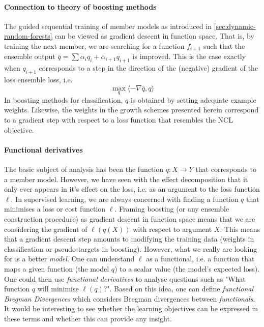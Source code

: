 \documentclass[
	twoside=false, %
]{kaobook}
\begin{document}
\paragraph{Connection to theory of boosting methods} The guided sequential training of member models as introduced in \cref{sec:dynamic-random-forests} can be viewed as gradient descent in function space. That is, by training the next member, we are searching for a function $f_{i+1}$ such that the ensemble output $\bar{q} = \sum \alpha_i q_i + \alpha_{i+1} q_{i+1}$ is improved.
This is the case exactly when $q_{i+1}$ corresponds to a step in the direction of the (negative) gradient of the loss ensemble loss, i.e.
$$
\max_q  \langle - \nabla \bar{q}, q \rangle
$$
In boosting methods for classification, $q$ is obtained by setting adequate example weights. Likewise, the weights in the growth schemes presented herein correspond to a gradient step with respect to a loss function that resembles the NCL objective.


\paragraph{Functional derivatives} The basic subject of analysis has been the function $q: X \to Y$ that corresponds to a member model. However, we have seen with the effect decomposition that it only ever appears in it's effect on the loss, i.e. as an argument to the loss function $\ell$. In supervised learning, we are always concerned with finding a function $q$ that minimises a loss or cost function $\ell$. 
Framing boosting (or any ensemble construction procedure) as gradient descent in function space means that we are considering the gradient of $\ell(q(X))$ with respect to argument $X$. This means that a gradient descent step amounts to modifying the training data (weights in classification or pseudo-targets in boosting). However, what we really are looking for is a better \textit{model}. One can understand $\ell$ as a functional, i.e. a function that maps a given function (the model $q$) to a scalar value (the model's expected loss). One could then use \textit{functional derivatives} 
\cite{frigyik_IntroductionFunctionalDerivatives_} to analyse questions such as "What function $q$ will minimise $\ell(q)$?". Based on this idea, one can define \textit{functional Bregman Divergences} \cite{frigyik_FunctionalBregmanDivergence_2008} which considers Bregman divergences between \textit{functionals}. It would be interesting to see whether the learning objectives can be expressed in these terms and whether this can provide any insight.
\end{document}
